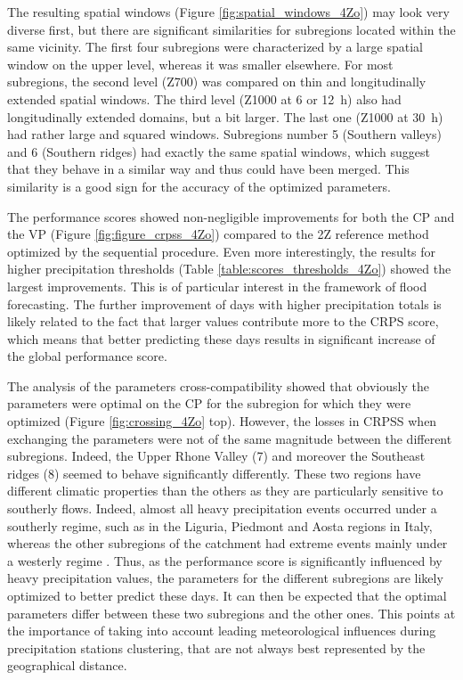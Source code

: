 \documentclass[review]{elsarticle}
\begin{document}
The resulting spatial windows (Figure \ref{fig:spatial_windows_4Zo}) may look very diverse first, but there are significant similarities for subregions located within the same vicinity. The first four subregions were characterized by a large spatial window on the upper level, whereas it was smaller elsewhere. For most subregions, the second level (Z700) was compared on thin and longitudinally extended spatial windows. The third level (Z1000 at 6 or 12~h) also had longitudinally extended domains, but a bit larger. The last one (Z1000 at 30~h) had rather large and squared windows. Subregions number 5 (Southern valleys) and 6 (Southern ridges) had exactly the same spatial windows, which suggest that they behave in a similar way and thus could have been merged. This similarity is a good sign for the accuracy of the optimized parameters.

The performance scores showed non-negligible improvements for both the CP and the VP (Figure \ref{fig:figure_crpss_4Zo}) compared to the 2Z reference method optimized by the sequential procedure. Even more interestingly, the results for higher precipitation thresholds (Table \ref{table:scores_thresholds_4Zo}) showed the largest improvements. This is of particular interest in the framework of flood forecasting. The further improvement of days with higher precipitation totals is likely related to the fact that larger values contribute more to the CRPS score, which means that better predicting these days results in significant increase of the global performance score.

The analysis of the parameters cross-compatibility showed that obviously the parameters were optimal on the CP for the subregion for which they were optimized (Figure \ref{fig:crossing_4Zo} top). However, the losses in CRPSS when exchanging the parameters were not of the same magnitude between the different subregions. Indeed, the Upper Rhone Valley (7) and moreover the Southeast ridges (8) seemed to behave significantly differently. These two regions have different climatic properties than the others as they are particularly sensitive to southerly flows. Indeed, almost all heavy precipitation events occurred under a southerly regime, such as in the Liguria, Piedmont and Aosta regions in Italy, whereas the other subregions of the catchment had extreme events mainly under a westerly regime \citep{Horton2012}. Thus, as the performance score is significantly influenced by heavy precipitation values, the parameters for the different subregions are likely optimized to better predict these days. It can then be expected that the optimal parameters differ between these two subregions and the other ones. This points at the importance of taking into account leading meteorological influences during precipitation stations clustering, that are not always best represented by the geographical distance. 
\end{document}

